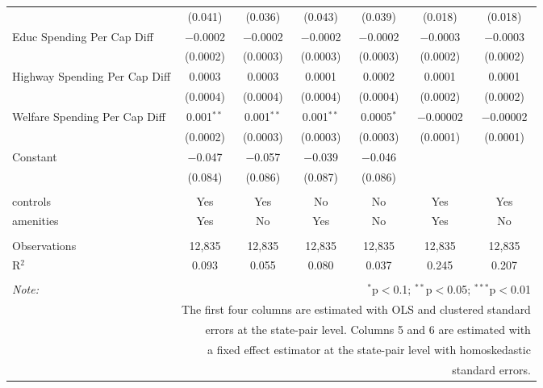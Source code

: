 \begin{table}[!htbp]
\begin{tabular}{@{\extracolsep{5pt}}lcccccc}
  & (0.041) & (0.036) & (0.043) & (0.039) & (0.018) & (0.018) \\ 
  Educ Spending Per Cap Diff & $-$0.0002 & $-$0.0002 & $-$0.0002 & $-$0.0002 & $-$0.0003 & $-$0.0003 \\ 
  & (0.0002) & (0.0003) & (0.0003) & (0.0003) & (0.0002) & (0.0002) \\ 
  Highway Spending Per Cap Diff & 0.0003 & 0.0003 & 0.0001 & 0.0002 & 0.0001 & 0.0001 \\ 
  & (0.0004) & (0.0004) & (0.0004) & (0.0004) & (0.0002) & (0.0002) \\ 
  Welfare Spending Per Cap Diff & 0.001$^{**}$ & 0.001$^{**}$ & 0.001$^{**}$ & 0.0005$^{*}$ & $-$0.00002 & $-$0.00002 \\ 
  & (0.0002) & (0.0003) & (0.0003) & (0.0003) & (0.0001) & (0.0001) \\ 
  Constant & $-$0.047 & $-$0.057 & $-$0.039 & $-$0.046 &  &  \\ 
  & (0.084) & (0.086) & (0.087) & (0.086) &  &  \\ 
 \hline \\[-1.8ex] 
controls & Yes & Yes & No & No & Yes & Yes \\ 
amenities & Yes & No & Yes & No & Yes & No \\ 
\hline \\[-1.8ex] 
Observations & 12,835 & 12,835 & 12,835 & 12,835 & 12,835 & 12,835 \\ 
R$^{2}$ & 0.093 & 0.055 & 0.080 & 0.037 & 0.245 & 0.207 \\ 
\hline 
\hline \\[-1.8ex] 
\textit{Note:}  & \multicolumn{6}{r}{$^{*}$p$<$0.1; $^{**}$p$<$0.05; $^{***}$p$<$0.01} \\ 
 & \multicolumn{6}{r}{The first four columns are estimated with OLS and clustered standard} \\ 
 & \multicolumn{6}{r}{ errors at the state-pair level. Columns 5 and 6 are estimated with} \\ 
 & \multicolumn{6}{r}{a fixed effect estimator at the state-pair level with homoskedastic} \\ 
 & \multicolumn{6}{r}{standard errors.} \\ 
\end{tabular} 
\end{table} 
